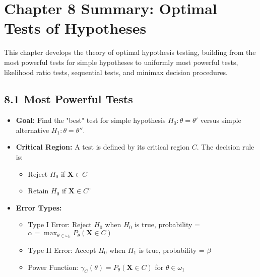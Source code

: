 \section{Chapter 8 Summary: Optimal Tests of Hypotheses}

This chapter develops the theory of optimal hypothesis testing, building from the most powerful tests for simple hypotheses to uniformly most powerful tests, likelihood ratio tests, sequential tests, and minimax decision procedures.

\subsection{8.1 Most Powerful Tests}

\begin{itemize}
	\item \textbf{Goal:} Find the "best" test for simple hypothesis $H_0: \theta = \theta'$ versus simple alternative $H_1: \theta = \theta''$.
	\item \textbf{Critical Region:} A test is defined by its critical region $C$. The decision rule is:
	\begin{itemize}
		\item Reject $H_0$ if $\mathbf{X} \in C$
		\item Retain $H_0$ if $\mathbf{X} \in C^c$
	\end{itemize}
	\item \textbf{Error Types:}
	\begin{itemize}
		\item Type I Error: Reject $H_0$ when $H_0$ is true, probability = $\alpha = \max_{\theta \in \omega_0} P_\theta(\mathbf{X} \in C)$
		\item Type II Error: Accept $H_0$ when $H_1$ is true, probability = $\beta$
		\item Power Function: $\gamma_C(\theta) = P_\theta(\mathbf{X} \in C)$ for $\theta \in \omega_1$
	\end{itemize}
\end{itemize}

